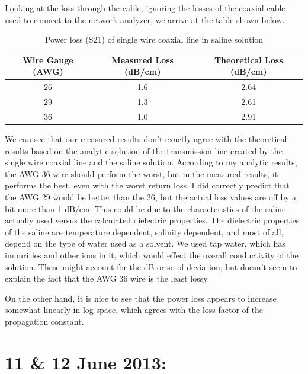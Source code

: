 \documentclass[12pt,onecolumn,titlepage]{article}
\begin{document}
Looking at the loss through the cable, ignoring the losses of the coaxial cable used to connect to the network analyzer, we arrive at the table shown below.

\begin{table}[h]
\centering
	\caption{Power loss (S21) of single wire coaxial line in saline solution}
	\begin{tabular}{| c | c | c |}
	\hline
	 Wire Gauge (AWG) & Measured Loss (dB/cm) & Theoretical Loss (dB/cm) \\ \hline
	 26 & 1.6 & 2.64 \\ \hline
	 29 & 1.3 & 2.61  \\ \hline
	 36 & 1.0 & 2.91  \\ \hline
	 \end{tabular}
\label{tab:power_loss}
\end{table}

We can see that our measured results don't exactly agree with the theoretical results based on the analytic solution of the transmission line created by the single wire coaxial line and the saline solution. According to my analytic results, the AWG 36 wire should perform the worst, but in the measured results, it performs the best, even with the worst return loss. I did correctly predict that the AWG 29 would be better than the 26, but the actual loss values are off by a bit more than 1 dB/cm. This could be due to the characteristics of the saline actually used versus the calculated dielectric properties. The dielectric properties of the saline are temperature dependent, salinity dependent, and most of all, depend on the type of water used as a solvent. We used tap water, which has impurities and other ions in it, which would effect the overall conductivity of the solution. These might account for the dB or so of deviation, but doesn't seem to explain the fact that the AWG 36 wire is the least lossy.

On the other hand, it is nice to see that the power loss appears to increase somewhat linearly in log space, which agrees with the loss factor of the propagation constant.




\clearpage
\section{11 \& 12 June 2013:}
\end{document}
